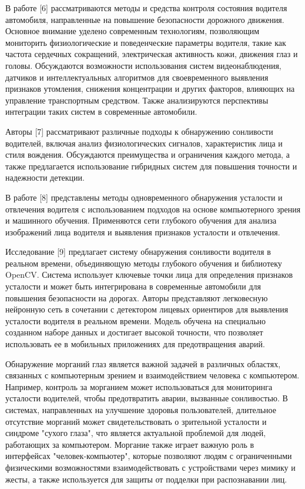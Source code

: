 \begin{multicols}{2}
В работе {[}6{]} рассматриваются методы и средства контроля состояния
водителя автомобиля, направленные на повышение безопасности дорожного
движения. Основное внимание уделено современным технологиям, позволяющим
мониторить физиологические и поведенческие параметры водителя, такие как
частота сердечных сокращений, электрическая активность кожи, движения
глаз и головы. Обсуждаются возможности использования систем
видеонаблюдения, датчиков и интеллектуальных алгоритмов для
своевременного выявления признаков утомления, снижения концентрации и
других факторов, влияющих на управление транспортным средством. Также
анализируются перспективы интеграции таких систем в современные
автомобили.

Авторы {[}7{]} рассматривают различные подходы к обнаружению сонливости
водителей, включая анализ физиологических сигналов, характеристик лица и
стиля вождения. Обсуждаются преимущества и ограничения каждого метода, а
также предлагается использование гибридных систем для повышения точности
и надежности детекции.

В работе {[}8{]} представлены методы одновременного обнаружения
усталости и отвлечения водителя с использованием подходов на основе
компьютерного зрения и машинного обучения. Применяются сети глубокого
обучения для анализа изображений лица водителя и выявления признаков
усталости и отвлечения.

Исследование {[}9{]} предлагает систему обнаружения сонливости водителя
в реальном времени, объединяющую методы глубокого обучения и библиотеку
OpenCV. Система использует ключевые точки лица для определения признаков
усталости и может быть интегрирована в современные автомобили для
повышения безопасности на дорогах. Авторы представляют легковесную
нейронную сеть в сочетании с детектором лицевых ориентиров для выявления
усталости водителя в реальном времени. Модель обучена на специально
созданном наборе данных и достигает высокой точности, что позволяет
использовать ее в мобильных приложениях для предотвращения аварий.

Обнаружение морганий глаз является важной задачей в различных областях,
связанных с компьютерным зрением и взаимодействием человека с
компьютером. Например, контроль за морганием может использоваться для
мониторинга усталости водителей, чтобы предотвратить аварии, вызванные
сонливостью. В системах, направленных на улучшение здоровья
пользователей, длительное отсутствие морганий может свидетельствовать о
зрительной усталости и синдроме "сухого глаза", что является актуальной
проблемой для людей, работающих за компьютером. Моргание также играет
важную роль в интерфейсах "человек-компьютер", которые позволяют людям с
ограниченными физическими возможностями взаимодействовать с устройствами
через мимику и жесты, а также используется для защиты от подделки при
распознавании лиц.


\end{multicols}
